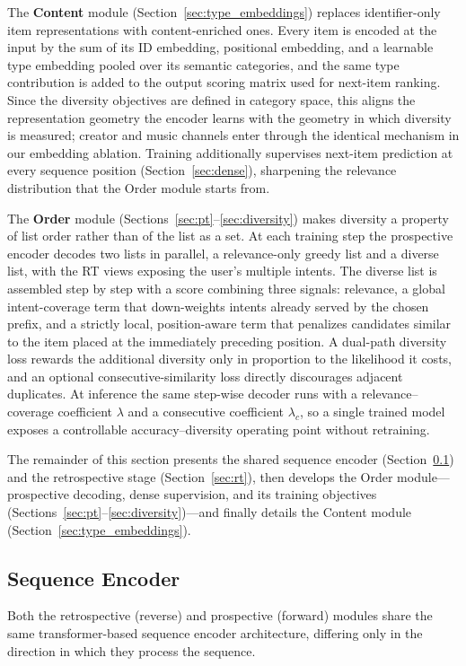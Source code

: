 The \textbf{Content} module (Section~\ref{sec:type_embeddings}) replaces identifier-only item representations with content-enriched ones. Every item is encoded at the input by the sum of its ID embedding, positional embedding, and a learnable type embedding pooled over its semantic categories, and the same type contribution is added to the output scoring matrix used for next-item ranking. Since the diversity objectives are defined in category space, this aligns the representation geometry the encoder learns with the geometry in which diversity is measured; creator and music channels enter through the identical mechanism in our embedding ablation. Training additionally supervises next-item prediction at every sequence position (Section~\ref{sec:dense}), sharpening the relevance distribution that the Order module starts from.

The \textbf{Order} module (Sections~\ref{sec:pt}--\ref{sec:diversity}) makes diversity a property of list order rather than of the list as a set. At each training step the prospective encoder decodes two lists in parallel, a relevance-only greedy list and a diverse list, with the RT views exposing the user's multiple intents. The diverse list is assembled step by step with a score combining three signals: relevance, a global intent-coverage term that down-weights intents already served by the chosen prefix, and a strictly local, position-aware term that penalizes candidates similar to the item placed at the immediately preceding position. A dual-path diversity loss rewards the additional diversity only in proportion to the likelihood it costs, and an optional consecutive-similarity loss directly discourages adjacent duplicates. At inference the same step-wise decoder runs with a relevance--coverage coefficient $\lambda$ and a consecutive coefficient $\lambda_c$, so a single trained model exposes a controllable accuracy--diversity operating point without retraining.

The remainder of this section presents the shared sequence encoder (Section~\ref{sec:encoder}) and the retrospective stage (Section~\ref{sec:rt}), then develops the Order module---prospective decoding, dense supervision, and its training objectives (Sections~\ref{sec:pt}--\ref{sec:diversity})---and finally details the Content module (Section~\ref{sec:type_embeddings}).



\subsection{Sequence Encoder}
\label{sec:encoder}
Both the retrospective (reverse) and prospective (forward) modules share the same transformer-based sequence encoder architecture, differing only in the direction in which they process the sequence.

